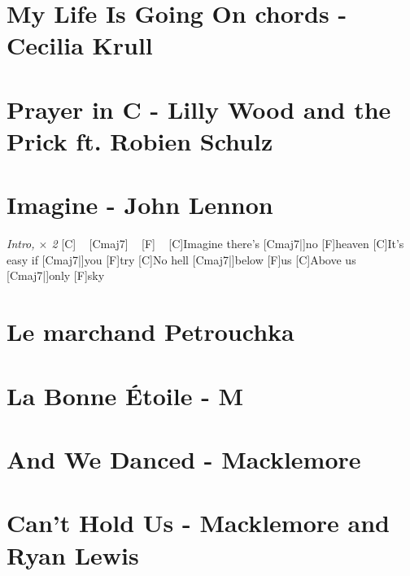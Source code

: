 \documentclass{guitartabs}
\begin{document}
\section{My Life Is Going On chords - Cecilia Krull }
\begin{guitar}

\end{guitar}

\section{Prayer in C - Lilly Wood and the Prick ft. Robien Schulz}




\section{Imagine - John Lennon}

\begin{guitar}
\emph{Intro, $\times$ 2}%
[C] ~ [Cmaj7]  ~ [F]  ~  %
[C]Imagine there's [Cmaj7|]{no} [F]heaven
[C]It's easy if [Cmaj7|]{you} [F]try
[C]No hell [Cmaj7|]{below} [F]us
[C]Above us [Cmaj7|]{only} [F]sky
\end{guitar}


\section{Le marchand Petrouchka}
\begin{guitar}

\end{guitar}

\section{La Bonne Étoile - M}
\begin{guitar}

\end{guitar}

\section{And We Danced - Macklemore}
\begin{guitar}

\end{guitar}

\section{Can't Hold Us - Macklemore and Ryan Lewis}
\begin{guitar}

\end{guitar}
\end{document}
